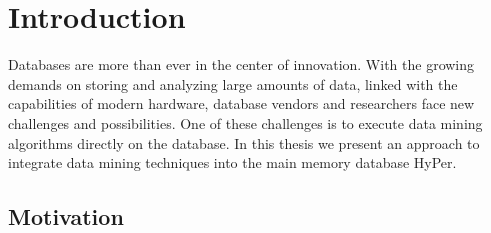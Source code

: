 \chapter{Introduction}\label{chapter:introduction}

Databases are more than ever in the center of innovation. With the growing demands on storing and analyzing large amounts of data, linked with the capabilities of modern hardware, database vendors and researchers face new challenges and possibilities. One of these challenges is to execute data mining algorithms directly on the database. In this thesis we present an approach to integrate data mining techniques into the main memory database HyPer.

\section{Motivation}

